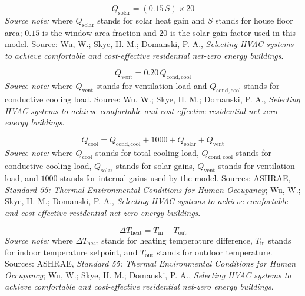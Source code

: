 \documentclass[12pt]{article}
\begin{document}
\begin{equation}
\label{eq:hvac_solar_gains}
Q_{\mathrm{solar}} = (0.15\,S)\times 20
\end{equation}
\noindent\textit{Source note:} where $Q_{\mathrm{solar}}$ stands for solar heat gain and $S$ stands for house floor area; $0.15$ is the window-area fraction and $20$ is the solar gain factor used in this model. Source: Wu, W.; Skye, H. M.; Domanski, P. A., \emph{Selecting HVAC systems to achieve comfortable and cost-effective residential net-zero energy buildings}.

\begin{equation}
\label{eq:hvac_ventilation_load}
Q_{\mathrm{vent}} = 0.20\,Q_{\mathrm{cond,cool}}
\end{equation}
\noindent\textit{Source note:} where $Q_{\mathrm{vent}}$ stands for ventilation load and $Q_{\mathrm{cond,cool}}$ stands for conductive cooling load. Source: Wu, W.; Skye, H. M.; Domanski, P. A., \emph{Selecting HVAC systems to achieve comfortable and cost-effective residential net-zero energy buildings}.

\begin{equation}
\label{eq:hvac_total_cooling_load}
Q_{\mathrm{cool}} = Q_{\mathrm{cond,cool}} + 1000 + Q_{\mathrm{solar}} + Q_{\mathrm{vent}}
\end{equation}
\noindent\textit{Source note:} where $Q_{\mathrm{cool}}$ stands for total cooling load, $Q_{\mathrm{cond,cool}}$ stands for conductive cooling load, $Q_{\mathrm{solar}}$ stands for solar gains, $Q_{\mathrm{vent}}$ stands for ventilation load, and $1000$ stands for internal gains used by the model. Sources: ASHRAE, \emph{Standard 55: Thermal Environmental Conditions for Human Occupancy}; Wu, W.; Skye, H. M.; Domanski, P. A., \emph{Selecting HVAC systems to achieve comfortable and cost-effective residential net-zero energy buildings}.

\begin{equation}
\label{eq:hvac_heating_delta_t}
\Delta T_{\mathrm{heat}} = T_{\mathrm{in}} - T_{\mathrm{out}}
\end{equation}
\noindent\textit{Source note:} where $\Delta T_{\mathrm{heat}}$ stands for heating temperature difference, $T_{\mathrm{in}}$ stands for indoor temperature setpoint, and $T_{\mathrm{out}}$ stands for outdoor temperature. Sources: ASHRAE, \emph{Standard 55: Thermal Environmental Conditions for Human Occupancy}; Wu, W.; Skye, H. M.; Domanski, P. A., \emph{Selecting HVAC systems to achieve comfortable and cost-effective residential net-zero energy buildings}.
\end{document}
